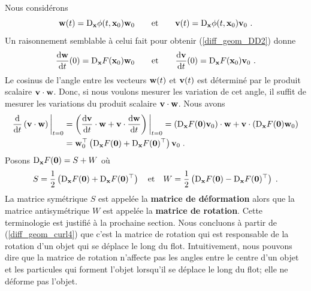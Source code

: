 {Nous considérons
\[
\VEC{w}(t) = \diff_{\VEC{x}}\phi(t,\VEC{x}_0) \VEC{w}_0
\qquad \text{et} \qquad
\VEC{v}(t) = \diff_{\VEC{x}}\phi(t,\VEC{x}_0) \VEC{v}_0 \ .
\]
Un raisonnement semblable à celui fait pour obtenir
(\ref{diff_geom_DD2}) donne
\[
\dydx{\VEC{w}}{t}(0) = \diff_{\VEC{x}} F(\VEC{x}_0) \VEC{w}_0
\qquad \text{et} \qquad 
\dydx{\VEC{v}}{t}(0) = \diff_{\VEC{x}} F(\VEC{x}_0) \VEC{v}_0 \ .
\]
Le cosinus de l'angle entre les vecteurs $\VEC{w}(t)$ et $\VEC{v}(t)$
est déterminé par le produit scalaire $\VEC{v} \cdot \VEC{w}$.  Donc,
si nous voulons mesurer les variation de cet angle, il suffit de mesurer
les variations du produit scalaire $\VEC{v} \cdot \VEC{w}$.  Nous
avons
\begin{align}
\dfdx{\left(\VEC{v}\cdot \VEC{w}\right)}{t}\bigg|_{t=0} &=
\left( \dydx{\VEC{v}}{t} \cdot \VEC{w}
+ \VEC{v} \cdot \dydx{\VEC{w}}{t} \right)\bigg|_{t=0}
= \left( \diff_{\VEC{x}} F(\VEC{0}) \VEC{v}_0 \right)\cdot \VEC{w}
+ \VEC{v} \cdot \left( \diff_{\VEC{x}} F(\VEC{0}) \VEC{w}_0 \right)
\nonumber \\
&= \VEC{w}_0^\top \left( \diff_{\VEC{x}} F(\VEC{0})
+ \diff_{\VEC{x}} F(\VEC{0})^\top \right) \VEC{v}_0
\; . \label{diff_geom_curl4}
\end{align}
Posons
$\displaystyle \diff_{\VEC{x}} F(\VEC{0}) = S + W$ où 
\[
S = \frac{1}{2} \left( \diff_{\VEC{x}} F(\VEC{0}) +
\diff_{\VEC{x}} F(\VEC{0})^\top \right) \quad \text{et} \quad
W =
\frac{1}{2} \left( \diff_{\VEC{x}} F(\VEC{0})
- \diff_{\VEC{x}} F(\VEC{0})^\top \right)
\; .
\]
La matrice symétrique $S$ est appelée la {\bfseries matrice de
déformation} alors que
la matrice antisymétrique $W$ est appelée la {\bfseries matrice de
rotation}.  Cette terminologie est justifié
à la prochaine section.  Nous concluons à partir de
(\ref{diff_geom_curl4}) que c'est la matrice de rotation qui est
responsable de la rotation d'un objet qui se déplace le long du flot.
Intuitivement, nous pouvons dire que la matrice de rotation n'affecte pas
les angles entre le centre d'un objet et les particules qui forment
l'objet lorsqu'il se déplace le long du flot; elle ne déforme pas
l'objet.

}
